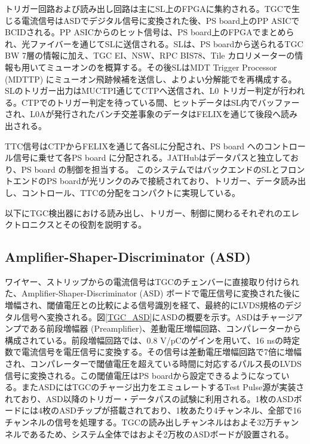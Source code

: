 トリガー回路および読み出し回路は主にSL上のFPGAに集約される。TGCで生じる電流信号はASDでデジタル信号に変換された後、PS board上のPP ASICでBCIDされる。PP ASICからのヒット信号は、PS board上のFPGAでまとめられ、光ファイバーを通じてSLに送信される。SLは、PS boardから送られるTGC BW 7層の情報に加え、TGC EI、NSW、RPC BIS78、Tile カロリメーターの情報も用いてミューオンの\pt を概算する。その後SLはMDT Trigger Processor (MDTTP) にミューオン飛跡候補を送信し、よりよい分解能で\pt を再構成する。SLのトリガー出力はMUCTPI通じてCTPへ送信され、L0 トリガー判定が行われる。CTPでのトリガー判定を待っている間、ヒットデータはSL内でバッファーされ、L0Aが発行されたバンチ交差事象のデータはFELIXを通じて後段へ読み出される。

TTC信号はCTPからFELIXを通じて各SLに分配され、PS board へのコントロール信号に乗せて各PS board に分配される。JATHubはデータパスと独立しており、PS board の制御を担当する。
このシステムではバックエンドのSLとフロントエンドのPS boardが光リンクのみで接続されており、トリガー、データ読み出し、コントロール、TTCの分配をコンパクトに実現している。

以下にTGC検出器における読み出し、トリガー、制御に関わるそれぞれのエレクトロニクスとその役割を説明する。

        \subsection*{Amplifier-Shaper-Discriminator (ASD)}
    ワイヤー、ストリップからの電流信号はTGCのチェンバーに直接取り付けられた、Amplifier-Shaper-Discriminator  (ASD) ボードで電圧信号に変換された後に増幅され、閾値電圧との比較による信号識別を経て、最終的にLVDS規格のデジタル信号へ変換される。図\ref{TGC_ASD}にASDの概要を示す。ASDはチャージアンプである前段増幅器 (Preamplifier)、差動電圧増幅回路、コンパレーターから構成されている。前段増幅回路では、0.8 V/pCのゲインを用いて、16 nsの時定数で電流信号を電圧信号に変換する。その信号は差動電圧増幅回路で7倍に増幅され、コンパレーターで閾値電圧を超えている時間に対応するパルス長のLVDS信号に変換される。この閾値電圧はPS boardから設定できるようになっている。またASDにはTGCのチャージ出力をエミュレートするTest Pulse源が実装されており、ASD以降のトリガー・データパスの試験に利用される。1枚のASDボードには4枚のASDチップが搭載されており、1枚あたり4チャンネル、全部で16チャンネルの信号を処理する。TGCの読み出しチャンネルはおよそ32万チャンネルであるため、システム全体ではおよそ2万枚のASDボードが設置される。

